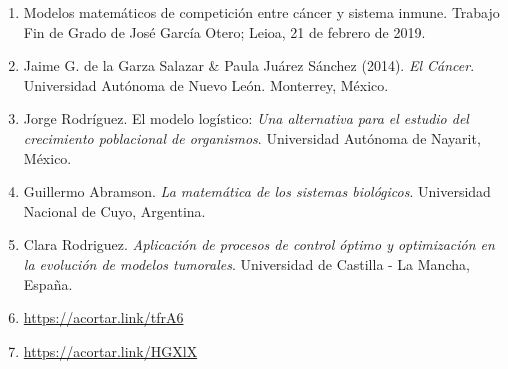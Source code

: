 \begin{enumerate}
		\item Modelos matemáticos de competición entre cáncer y sistema inmune. Trabajo Fin de Grado de José García Otero; Leioa, 21 de febrero de 2019.
		\item Jaime G. de la Garza Salazar \& Paula Juárez Sánchez (2014). \textit{El Cáncer}. Universidad Autónoma de Nuevo León. Monterrey, México.
		\item Jorge Rodríguez. El modelo logístico: \textit{Una alternativa para el estudio del crecimiento poblacional de organismos}. Universidad Autónoma de Nayarit, México.
		\item Guillermo Abramson. \textit{La matemática de los sistemas biológicos}. Universidad Nacional de Cuyo, Argentina.
		\item Clara Rodriguez. \textit{Aplicación de procesos de control óptimo y optimización en la evolución de modelos tumorales}. Universidad de Castilla - La Mancha, España.
		\item \url{https://acortar.link/tfrA6}
		\item \url{https://acortar.link/HGXlX}
	\end{enumerate}